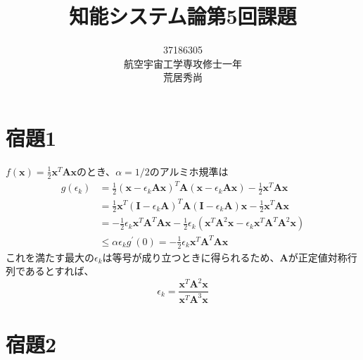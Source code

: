 \documentclass[10pt,a4paper]{ltjsarticle}       %
\title{知能システム論第5回課題}
\author{37186305\\航空宇宙工学専攻修士一年\\荒居秀尚}
\begin{document}
    \maketitle
    \section{宿題1}
    $f(\bm{x}) = \frac{1}{2}\bm{x}^{T}\bm{A}\bm{x}$のとき、$\alpha=1/2$のアルミホ規準は
    \begin{align}
      g(\epsilon_k) &= \frac{1}{2} (\bm{x} - \epsilon_k \bm{A}\bm{x})^{T} \bm{A} (\bm{x} - \epsilon_k \bm{A} \bm{x}) - \frac{1}{2} \bm{x}^{T} \bm{A} \bm{x} \\
                          &= \frac{1}{2} \bm{x}^{T} (\bm{I} - \epsilon_k \bm{A})^{T} \bm{A} (\bm{I} - \epsilon_k \bm{A}) \bm{x} -  \frac{1}{2} \bm{x}^{T} \bm{A} \bm{x} \\
                          &= -\frac{1}{2} \epsilon_k \bm{x}^{T} \bm{A}^{T} \bm{A} \bm{x} - \frac{1}{2} \epsilon_k (\bm{x}^{T} \bm{A}^2 \bm{x} - \epsilon_k \bm{x}^T \bm{A}^T \bm{A}^2 \bm{x}) \\
                          &\le \alpha \epsilon_k g^{\prime} (0) = -\frac{1}{2} \epsilon_k \bm{x}^{T} \bm{A}^{T} \bm{A} \bm{x}
    \end{align}
    これを満たす最大の$\epsilon_k$は等号が成り立つときに得られるため、$\bm{A}$が正定値対称行列であるとすれば、
    \begin{equation}
    \epsilon_k = \frac{\bm{x}^T\bm{A}^2\bm{x}}{\bm{x}^T\bm{A}^3\bm{x}}
    \end{equation}
    
    \section{宿題2}
    
    
\end{document}
